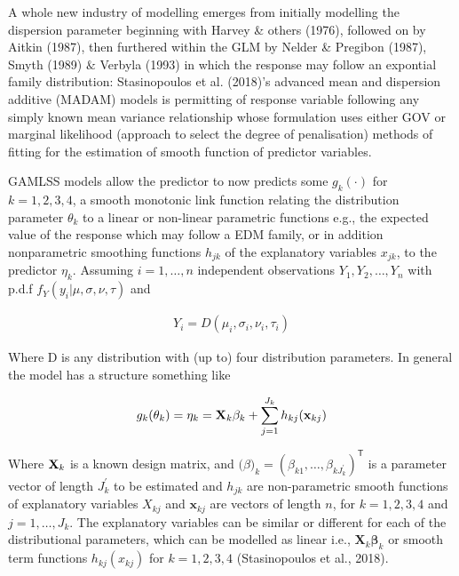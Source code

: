 \documentclass{DissertateUSU}
\begin{document}
A whole new industry of modelling emerges from initially modelling the
dispersion parameter beginning with Harvey \& others (1976), followed on
by Aitkin (1987), then furthered within the GLM by Nelder \& Pregibon
(1987), Smyth (1989) \(\&\) Verbyla (1993) in which the response may
follow an expontial family distribution: Stasinopoulos et al. (2018)'s
advanced mean and dispersion additive (MADAM) models is permitting of
response variable following any simply known mean variance relationship
whose formulation uses either GOV or marginal likelihood (approach to
select the degree of penalisation) methods of fitting for the estimation
of smooth function of predictor variables.\medskip

GAMLSS models allow the predictor to now predicts some \(g_k(\cdot)\)
for \(k=1,2,3,4\), a smooth monotonic link function relating the
distribution parameter \(\theta_k\) to a linear or non-linear parametric
functions e.g., the expected value of the response which may follow a
EDM family, or in addition nonparametric smoothing functions \(h_{jk}\)
of the explanatory variables \(x_{jk}\), to the predictor \(\eta_k\).
Assuming \(i=1,\ldots,n\) independent observations
\(Y_1,Y_2,\ldots,Y_n\) with p.d.f \(f_Y(y_i|\mu,\sigma,\nu,\tau)\) and

\singlespacing

\begin{eqnarray}
Y_i = D(\mu_i,\sigma_i,\nu_i,\tau_i)
\end{eqnarray} \doublespacing

Where D is any distribution with (up to) four distribution parameters.
In general the model has a structure something like

\singlespacing

\begin{eqnarray}\label{EqnGAMLSS}
g_k(\theta_k) = \eta_k = \mathbf{\Large{X}}_k\mathbf{\beta}_k + \sum_{j=1}^{J_k}h_{kj}(\mathbf{x}_{kj})
\end{eqnarray} \doublespacing

Where \(\mathbf{\Large{X}}_k\) is a known design matrix, and
\(\mathbf(\beta)_k = (\beta_{k1},\ldots,\beta_{kJ_{k}^\prime})^\mathsf{T}\)
is a parameter vector of length \(J_{k}^\prime\) to be estimated and
\(h_{jk}\) are non-parametric smooth functions of explanatory variables
\(X_{kj}\) and \(\mathbf{x}_{kj}\) are vectors of length \(n\), for
\(k=1,2,3,4\) and \(j=1,\ldots,J_k\). The explanatory variables can be
similar or different for each of the distributional parameters, which
can be modelled as linear i.e., \(\mathbf{X}_k\mathbf{\beta}_k\) or
smooth term functions \(h_{kj}(x_{kj})\) for \(k=1,2,3,4\)
(Stasinopoulos et al., 2018).
\end{document}

